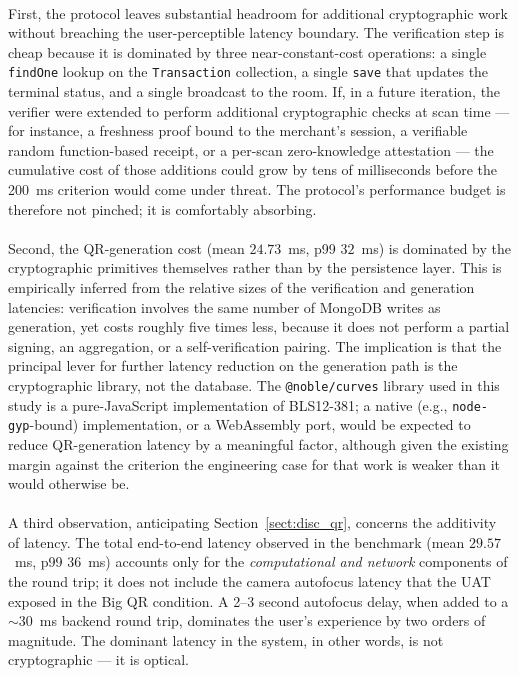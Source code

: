 \paragraph{}First, the protocol leaves substantial headroom for additional cryptographic work without breaching the user-perceptible latency boundary. The verification step is cheap because it is dominated by three near-constant-cost operations: a single \texttt{findOne} lookup on the \texttt{Transaction} collection, a single \texttt{save} that updates the terminal status, and a single broadcast to the room. If, in a future iteration, the verifier were extended to perform additional cryptographic checks at scan time --- for instance, a freshness proof bound to the merchant's session, a verifiable random function-based receipt, or a per-scan zero-knowledge attestation --- the cumulative cost of those additions could grow by tens of milliseconds before the 200~ms criterion would come under threat. The protocol's performance budget is therefore not pinched; it is comfortably absorbing.

\paragraph{}Second, the QR-generation cost (mean $24.73$~ms, p99 $32$~ms) is dominated by the cryptographic primitives themselves rather than by the persistence layer. This is empirically inferred from the relative sizes of the verification and generation latencies: verification involves the same number of MongoDB writes as generation, yet costs roughly five times less, because it does not perform a partial signing, an aggregation, or a self-verification pairing. The implication is that the principal lever for further latency reduction on the generation path is the cryptographic library, not the database. The \texttt{@noble/curves} library used in this study is a pure-JavaScript implementation of BLS12-381; a native (e.g., \texttt{node-gyp}-bound) implementation, or a WebAssembly port, would be expected to reduce QR-generation latency by a meaningful factor, although given the existing margin against the criterion the engineering case for that work is weaker than it would otherwise be.

\paragraph{}A third observation, anticipating Section~\ref{sect:disc_qr}, concerns the additivity of latency. The total end-to-end latency observed in the benchmark (mean $29.57$~ms, p99 $36$~ms) accounts only for the \textit{computational and network} components of the round trip; it does not include the camera autofocus latency that the UAT exposed in the Big QR condition. A 2--3 second autofocus delay, when added to a $\sim 30$~ms backend round trip, dominates the user's experience by two orders of magnitude. The dominant latency in the system, in other words, is not cryptographic --- it is optical.

